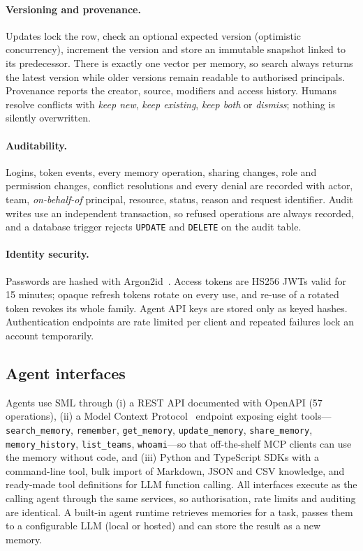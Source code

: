 \documentclass[11pt,a4paper]{article}
\newcommand{\sys}{SML}
\begin{document}
\paragraph{Versioning and provenance.} Updates lock the row, check an optional expected version
(optimistic concurrency), increment the version and store an immutable snapshot linked to its predecessor.
There is exactly one vector per memory, so search always returns the latest version while older versions
remain readable to authorised principals. Provenance reports the creator, source, modifiers and access
history. Humans resolve conflicts with \emph{keep new}, \emph{keep existing}, \emph{keep both} or
\emph{dismiss}; nothing is silently overwritten.

\paragraph{Auditability.} Logins, token events, every memory operation, sharing changes, role and
permission changes, conflict resolutions and every denial are recorded with actor, team,
\emph{on-behalf-of} principal, resource, status, reason and request identifier. Audit writes use an
independent transaction, so refused operations are always recorded, and a database trigger rejects
\texttt{UPDATE} and \texttt{DELETE} on the audit table.

\paragraph{Identity security.} Passwords are hashed with Argon2id~\cite{biryukov2016argon2}. Access tokens
are HS256 JWTs valid for 15 minutes; opaque refresh tokens rotate on every use, and re-use of a rotated
token revokes its whole family. Agent API keys are stored only as keyed hashes. Authentication endpoints
are rate limited per client and repeated failures lock an account temporarily.

\subsection{Agent interfaces}

\begin{sloppypar}
Agents use \sys{} through (i) a REST API documented with OpenAPI (57 operations), (ii) a Model Context
Protocol~\cite{anthropic2024mcp} endpoint exposing eight tools---\texttt{search\_memory}, \texttt{remember},
\texttt{get\_memory}, \texttt{update\_memory}, \texttt{share\_memory}, \texttt{memory\_history},
\texttt{list\_teams}, \texttt{whoami}---so that off-the-shelf MCP clients can use the memory without code,
and (iii) Python and TypeScript SDKs with a command-line tool, bulk import of Markdown, JSON and CSV
knowledge, and ready-made tool definitions for LLM function calling. All interfaces execute as the calling
agent through the same services, so authorisation, rate limits and auditing are identical. A built-in
agent runtime retrieves memories for a task, passes them to a configurable LLM (local or hosted) and can
store the result as a new memory.
\end{sloppypar}
\end{document}
